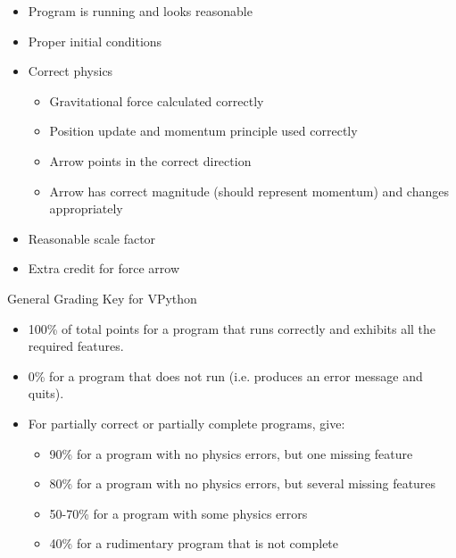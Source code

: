 \documentclass[11pt]{article}
\begin{document}
\begin{noindent}
\begin{flushleft}
\begin{itemize}
\item Program is running and looks reasonable
\item Proper initial conditions
\item Correct physics
\begin{itemize}
\item Gravitational force calculated correctly
\item Position update and momentum principle used correctly
\item Arrow points in the correct direction
\item Arrow has correct magnitude (should represent momentum) and changes appropriately
\end{itemize}
\item Reasonable scale factor
\item Extra credit for force arrow
\end{itemize}

\begin{description}
\item[General Grading Key for VPython] 
\end{description}
\begin{itemize}
\item 100\% of total points for a program that runs correctly and exhibits all the required features.
\item 0\% for a program that does not run (i.e. produces an error message and quits).
\item For partially correct or partially complete programs, give:
\begin{itemize}
\item 90\% for a program with no physics errors, but one missing feature
\item 80\% for a program with no physics errors, but several missing features
\item 50-70\% for a program with some physics errors
\item 40\% for a rudimentary program that is not complete
\end{itemize}
\end{itemize}

\end{flushleft}
\end{noindent}
\end{document}
